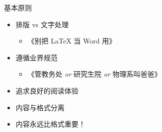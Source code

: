 \begin{frame}{基本原则}
\begin{itemize}
  \item<+-> 排版 vs 文字处理

    \begin{itemize}
      \item 《别把 \LaTeX{} 当 Word 用》
    \end{itemize}

  \item<+-> 遵循业界规范

    \begin{itemize}
      \item 《管教务处 \textit{or} 研究生院 \textit{or} 物理系叫爸爸》
    \end{itemize}

  \item<+-> 追求良好的阅读体验
  \item<+-> 内容与格式分离
  \item<+-> \alert{内容永远比格式重要！}
\end{itemize}
\end{frame}
